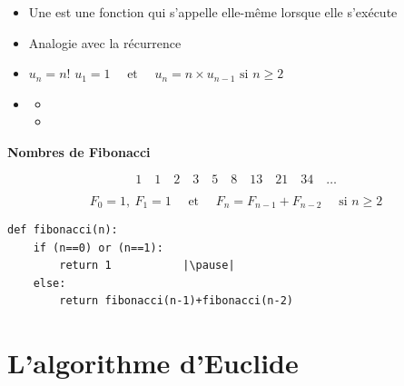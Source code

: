 \begin{frame}[fragile]

\begin{itemize}
  \item Une  est une fonction qui 
  s'appelle elle-même lorsque elle s’exécute 
\pause  
  \item Analogie avec la récurrence
\pause  
  \item $u_n = n!$ \pause \hfill $u_1 = 1 \quad \text{ et } \quad u_{n} = n \times u_{n-1} \text{ si } n \ge 2$
\pause  
  \item 
  \begin{itemize}
    \item {} \pause \qquad  {}
\pause 
    \item {} \pause \qquad\qquad  {}
  \end{itemize}  
\end{itemize}
\end{frame}


\begin{frame}[fragile]

\hfill\hfill\textbf{Nombres de Fibonacci}

$$1 \quad 1 \quad 2 \quad 3 \quad 5 \quad 8 \quad 13 \quad 21 \quad 34 \quad \ldots$$

\pause

$$F_0 = 1, \ F_1 = 1 \quad \text{ et } \quad F_{n} = F_{n-1} + F_{n-2} \quad  \text{ si } n \ge 2$$

\pause


\begin{algo}[recursif.py (2)]
\begin{lstlisting}
def fibonacci(n):
    if (n==0) or (n==1):
        return 1           |\pause|
    else: 
        return fibonacci(n-1)+fibonacci(n-2)
\end{lstlisting}  
\end{algo}

\end{frame}




\section{L'algorithme d'Euclide}

